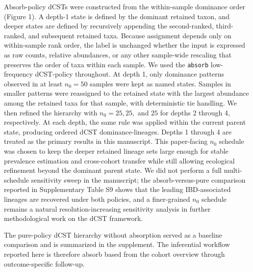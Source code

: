 \documentclass[
  11pt,
]{article}
\begin{document}
Absorb-policy dCSTs were constructed from the within-sample dominance
order (Figure 1). A depth-1 state is defined by the dominant retained
taxon, and deeper states are defined by recursively appending the
second-ranked, third-ranked, and subsequent retained taxa. Because
assignment depends only on within-sample rank order, the label is
unchanged whether the input is expressed as raw counts, relative
abundances, or any other sample-wide rescaling that preserves the order
of taxa within each sample. We used the \texttt{absorb} low-frequency
dCST-policy throughout. At depth 1, only dominance patterns observed in at
least \(n_0 = 50\) samples were kept as named states. Samples in smaller
patterns were reassigned to the retained state with the largest abundance
among the retained taxa for that sample, with deterministic tie handling.
We then refined the hierarchy with \(n_0 = 25, 25,\) and \(25\) for
depths 2 through 4, respectively. At each depth, the same rule was
applied within the current parent state, producing ordered dCST
dominance-lineages.
Depths 1 through 4 are treated as the primary results in this
manuscript. This paper-facing \(n_0\) schedule was chosen to keep the
deeper retained lineage sets large enough for stable prevalence
estimation and cross-cohort transfer while still allowing ecological
refinement beyond the dominant parent state. We did not perform a full
multi-schedule sensitivity sweep in the manuscript; the
absorb-versus-pure comparison reported in Supplementary Table S9 shows
that the leading IBD-associated lineages are recovered under both
policies, and a finer-grained \(n_0\) schedule remains a natural
resolution-increasing sensitivity analysis in further methodological
work on the dCST framework.

The pure-policy dCST hierarchy without absorption served as a baseline
comparison and is summarized in the supplement. The inferential workflow
reported here is therefore absorb based from the cohort overview through
outcome-specific follow-up.
\end{document}
